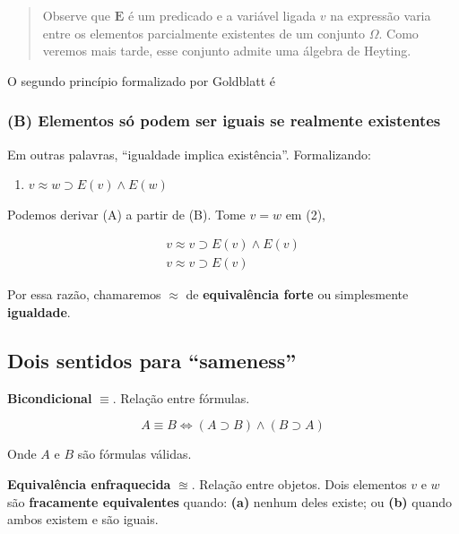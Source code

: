 \begin{quote}
Observe que \(\textbf{E}\) é um predicado e a variável ligada \(v\) na
expressão varia entre os elementos parcialmente existentes de um
conjunto \(\Omega\). Como veremos mais tarde, esse conjunto admite uma
álgebra de Heyting.
\end{quote}

O segundo princípio formalizado por Goldblatt é

\hypertarget{b-elementos-suxf3-podem-ser-iguais-se-realmente-existentes}{%
\subsubsection{(B) Elementos só podem ser iguais se realmente
existentes}\label{b-elementos-suxf3-podem-ser-iguais-se-realmente-existentes}}

Em outras palavras, ``igualdade implica existência''. Formalizando:

\begin{enumerate}
\def\labelenumi{\arabic{enumi}.}
\setcounter{enumi}{1}
\tightlist
\item
  \(v \approx w \supset E(v) \land E(w)\)
\end{enumerate}

Podemos derivar (A) a partir de (B). Tome \(v = w\) em (2),

\begin{align}
    v \approx v \supset E(v) \land E(v) \\
    v \approx v \supset E(v)
\end{align}

Por essa razão, chamaremos \(\approx\) de \textbf{equivalência forte} ou
simplesmente \textbf{igualdade}.

\hypertarget{dois-sentidos-para-sameness}{%
\subsection{Dois sentidos para
``sameness''}\label{dois-sentidos-para-sameness}}

\textbf{Bicondicional} \(\equiv\). Relação entre fórmulas.

\[
    A \equiv B  \Leftrightarrow (A \supset B) \land (B \supset A)
\]

Onde \(A\) e \(B\) são fórmulas válidas.

\textbf{Equivalência enfraquecida} \(\approxeq\). Relação entre objetos.
Dois elementos \(v\) e \(w\) são \textbf{fracamente equivalentes}
quando: \textbf{(a)} nenhum deles existe; ou \textbf{(b)} quando ambos
existem e são iguais.

